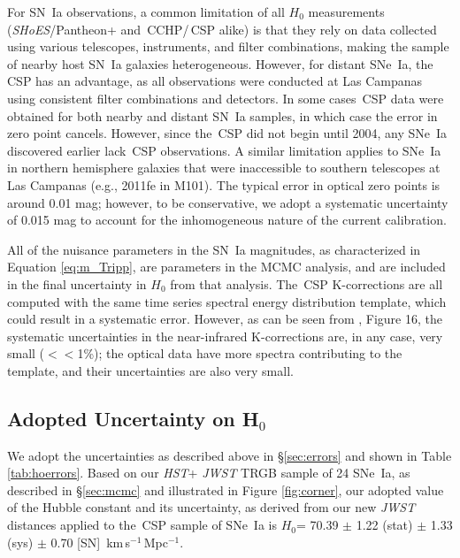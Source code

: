 \documentclass[12pt,modern]{aastex631}
\newcommand{\cchp}{\,CCHP\xspace}
\newcommand{\csp}{\,CSP\xspace}
\newcommand{\ho}{$H_{0}$\xspace}
\newcommand{\hounits}{\,km\,s$^{-1}$\,Mpc$^{-1}$\xspace}
\newcommand{\hst}{\emph{HST}\xspace}
\newcommand{\jwst}{\emph{JWST}\xspace}
\newcommand{\sne}{SNe~Ia\xspace}
\newcommand{\sn}{SN~Ia\xspace}
\newcommand{\shoes}{\emph{SHoES}\xspace}
\begin{document}
For \sn observations, a common limitation of all \ho measurements (\shoes/Pantheon+ and \cchp/\csp alike) is that they rely on data collected using various telescopes, instruments, and filter combinations, making the sample of nearby host \sn galaxies heterogeneous. However, for distant \sne, the \csp has an advantage, as all observations were conducted at Las Campanas using consistent filter combinations and detectors. In some cases \csp data were obtained for both nearby and distant \sn samples, in which case the error in zero point cancels.  However, since the \csp did not begin until 2004, any \sne discovered earlier lack \csp observations. A similar limitation applies to \sne in northern hemisphere galaxies that were inaccessible to southern telescopes at Las Campanas (e.g., 2011fe in M101). The typical error in optical zero points is around 0.01 mag; however, to be conservative, we adopt a systematic uncertainty of 0.015 mag to account for the inhomogeneous nature of the current calibration.   


All of the nuisance parameters in the \sn magnitudes, as characterized in Equation \ref{eq:m_Tripp}, are parameters in the MCMC analysis, and are  included in the final uncertainty in \ho from that analysis. The \csp K-corrections are all computed with the same time series spectral energy distribution template, which could result in a systematic error. However, as can be seen from \citet{lu_2023}, Figure 16,    the  systematic uncertainties in the near-infrared K-corrections are,  in any case, very small ($<<$1\%); the optical data have more spectra contributing to the template, and their uncertainties are also very small.  



\subsection{Adopted Uncertainty on H$_0$}

We adopt the uncertainties as described above in \S \ref{sec:errors} and shown in Table \ref{tab:hoerrors}.
Based on our \hst + \jwst TRGB sample of 24 \sne, as described in \S \ref{sec:mcmc} and illustrated in Figure \ref{fig:corner},
our adopted value of the Hubble constant and its uncertainty, as derived from our new \jwst distances applied to the \csp sample of \sne is \ho = 70.39  $\pm$ 1.22 (stat) $\pm$ 1.33 (sys) $\pm$ 0.70 [SN] \hounits. 
\end{document}
